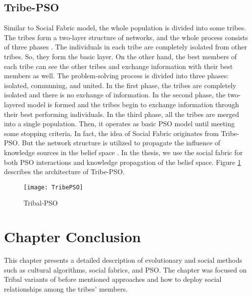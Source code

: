 \subsection{Tribe-PSO}
Similar to Social Fabric model, the whole population is divided into some tribes.  The tribes form a two-layer structure of networks, and the whole process consists of three phases \citet{chen2006tribe}. The individuals in each tribe are completely isolated from other tribes. So, they form the basic layer. On the other hand, the best members of each tribe can see the other tribes and exchange information with their best members as well. The problem-solving process is divided into three phases: isolated, communing, and united. In the first phase, the tribes are completely isolated and there is no exchange of information. In the second phase, the two-layered model is formed and the tribes begin to exchange information through their best performing individuals. In the third phase, all the tribes are merged into a single population. Then, it operates as basic PSO model until meeting some stopping criteria. In fact, the idea of Social Fabric originates from Tribe-PSO. But the network structure is utilized to propagate the influence of knowledge sources in the belief space \citet{ali2016leveraged}. In the thesis, we use the social fabric for both PSO interactions and knowledge propagation of the belief space. Figure \ref{fig:TribePSO} describes the architecture of Tribe-PSO.
\begin{figure}[h]
	\texttt{[image: TribePSO]}
	\centering
	\caption{Tribal-PSO}
	\label{fig:TribePSO}
\end{figure}

\section{Chapter Conclusion}
This chapter presents a detailed description of evolutionary and social methods such as cultural algorithms, social fabrics, and PSO. The chapter was focused on Tribal variants of before mentioned approaches and how to deploy social relationships among the tribes' members. 







